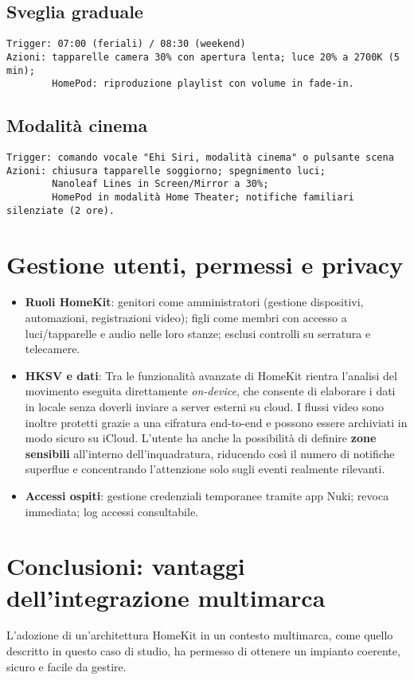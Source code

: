 \subsection*{Sveglia graduale}
\begin{verbatim}
Trigger: 07:00 (feriali) / 08:30 (weekend)
Azioni: tapparelle camera 30% con apertura lenta; luce 20% a 2700K (5 min);
        HomePod: riproduzione playlist con volume in fade-in.
\end{verbatim}

\subsection*{Modalità cinema}
\begin{verbatim}
Trigger: comando vocale "Ehi Siri, modalità cinema" o pulsante scena
Azioni: chiusura tapparelle soggiorno; spegnimento luci;
        Nanoleaf Lines in Screen/Mirror a 30%;
        HomePod in modalità Home Theater; notifiche familiari silenziate (2 ore).
\end{verbatim}

\section{Gestione utenti, permessi e privacy}
\begin{itemize}
  \item \textbf{Ruoli HomeKit}: genitori come amministratori (gestione dispositivi, automazioni, registrazioni video); figli come membri con accesso a luci/tapparelle e audio nelle loro stanze; esclusi controlli su serratura e telecamere.
  \item \textbf{HKSV e dati}: Tra le funzionalità avanzate di HomeKit rientra l’analisi del movimento eseguita direttamente \textit{on-device}, che consente di elaborare i dati in locale senza doverli inviare a server esterni su cloud. I flussi video sono inoltre protetti grazie a una cifratura end-to-end e possono essere archiviati in modo sicuro su iCloud. L’utente ha anche la possibilità di definire \textbf{zone sensibili} all’interno dell’inquadratura, riducendo così il numero di notifiche superflue e concentrando l’attenzione solo sugli eventi realmente rilevanti.

  \item \textbf{Accessi ospiti}: gestione credenziali temporanee tramite app Nuki; revoca immediata; log accessi consultabile.
\end{itemize}

\section{Conclusioni: vantaggi dell'integrazione multimarca}
L'adozione di un'architettura HomeKit in un contesto multimarca, come quello descritto in questo caso di studio, ha permesso di ottenere un impianto coerente, sicuro e facile da gestire.

